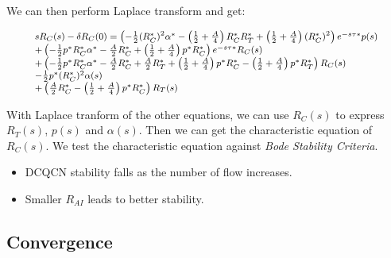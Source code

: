 We can then perform Laplace transform and get:

\begin{equation}
\small
\begin{array}{l}
s{R_C}(s) - \delta {R_C}(0) = \left( { - \frac{1}{2}{{(R_C^*)}^2}{\alpha ^*} - \left( {\frac{1}{2} + \frac{A}{4}} \right)R_C^*R_T^* + \left( {\frac{1}{2} + \frac{A}{4}} \right){{(R_C^*)}^2}} \right){e^{ - s\tau *}}p(s)\\
 + \left( { - \frac{1}{2}{p^*}R_C^*{\alpha ^*} - \frac{A}{2}R_C^* + \left( {\frac{1}{2} + \frac{A}{4}} \right){p^*}R_C^*} \right){e^{ - s\tau *}}{R_C}(s)\\
 + \left( { - \frac{1}{2}{p^*}R_C^*{\alpha ^*} - \frac{A}{2}R_C^* + \frac{A}{2}R_T^* + \left( {\frac{1}{2} + \frac{A}{4}} \right){p^*}R_C^* - \left( {\frac{1}{2} + \frac{A}{4}} \right){p^*}R_T^*} \right){R_C}(s)\\
 - \frac{1}{2}{p^*}{(R_C^*)^2}\alpha (s)\\
 + \left( {\frac{A}{2}R_C^* - \left( {\frac{1}{2} + \frac{A}{4}} \right){p^*}R_C^*} \right){R_T}(s)
\end{array}
\end{equation}

With Laplace tranform of the other equations, we can use ${R_C}(s)$ to express ${R_T}(s)$, $p(s)$ and $\alpha (s)$.
Then we can get the characteristic equation of ${R_C}(s)$. We test the characteristic equation against {\em Bode Stability
Criteria}. 

\begin{itemize}
\item DCQCN stability falls as the number of flow increases.
\item Smaller $R_{AI}$ leads to better stability.
\end{itemize}

\subsection{Convergence}
